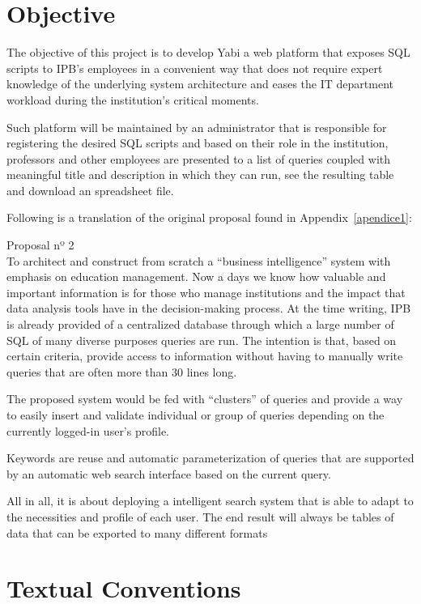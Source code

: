 \section{Objective}\label{objective}

The objective of this project is to develop \gls{Yabi} a web platform that exposes \gls{SQL} scripts to \gls{IPB}'s employees in a convenient way that does not require expert knowledge of the underlying system architecture and eases the \gls{IT} department workload during the institution's critical moments.

Such platform will be maintained by an administrator that is responsible for registering the desired \gls{SQL} scripts and based on their role in the institution, professors and other employees are presented to a list of queries coupled with meaningful title and description in which they can run, see the resulting table and download an spreadsheet file.

Following is a translation of the original proposal found in Appendix~\ref{apendice1}:
\begin{displayquote}
  Proposal nº 2\\
  To architect and construct from scratch a ``business intelligence'' system with emphasis on education management.
  Now a days we know how valuable and important information is for those who manage institutions and the impact that data analysis tools have in the decision-making process.
  At the time writing, \gls{IPB} is already provided of a centralized database through which a large number of \gls{SQL} of many diverse purposes queries are run.
  The intention is that, based on certain criteria, provide access to information without having to manually write queries that are often more than 30 lines long.

  The proposed system would be fed with ``clusters'' of queries and provide a way to easily insert and validate individual or group of queries depending on the currently logged-in user's profile.

  Keywords are reuse and automatic parameterization of queries that are supported by an automatic web search interface based on the current query.

  All in all, it is about deploying a intelligent search system that is able to adapt to the necessities and profile of each user. The end result will always be tables of data that can be exported to many different formats
\end{displayquote}

\section{Textual Conventions}

